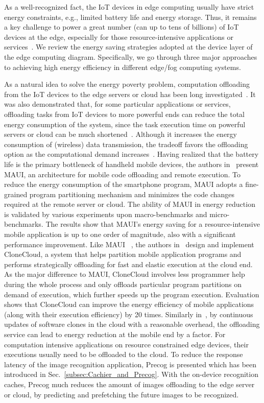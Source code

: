 As a well-recognized fact, the IoT devices in edge computing usually have strict energy constraints, e.g., limited battery life and energy storage. Thus, it remains a key challenge to power a great number (can up to tens of billions) of IoT devices at the edge, especially for those resource-intensive applications or services~. We review the energy saving strategies adopted at the device layer of the edge computing diagram. Specifically, we go through three major approaches to achieving high energy efficiency in different edge/fog computing systems.

As a natural idea to solve the energy poverty problem, computation offloading from the IoT devices to the edge servers or cloud has been long investigated~. It was also demonstrated that, for some particular applications or services, offloading tasks from IoT devices to more powerful ends can reduce the total energy consumption of the system, since the task execution time on powerful servers or cloud can be much shortened~. Although it increases the energy consumption of (wireless) data transmission, the tradeoff favors the offloading option as the computational demand increases~.
Having realized that the battery life is the primary bottleneck of handheld mobile devices, the authors in~ present MAUI, an architecture for mobile code offloading and remote execution. To reduce the energy consumption of the smartphone program, MAUI adopts a fine-grained program partitioning mechanism and minimizes the code changes required at the remote server or cloud. The ability of MAUI in energy reduction is validated by various experiments upon macro-benchmarks and micro-benchmarks. The results show that MAUI's energy saving for a resource-intensive mobile application is up to one order of magnitude, also with a significant performance improvement.
Like MAUI~ , the authors in~ design and implement CloneCloud, a system that helps partition mobile application programs and performs strategically offloading for fast and elastic execution at the cloud end. As the major difference to MAUI, CloneCloud involves less programmer help during the whole process and only offloads particular program partitions on demand of execution, which further speeds up the program execution. Evaluation shows that CloneCloud can improve the energy efficiency of mobile applications (along with their execution efficiency) by 20 times. Similarly in~, by continuous updates of software clones in the cloud with a reasonable overhead, the offloading service can lead to energy reduction at the mobile end by a factor.
For computation intensive applications on resource constrained edge devices, their executions usually need to be offloaded to the cloud. To reduce the response latency of the image recognition application, Precog is presented which has been introduced in Sec.~\ref{subsec:Cachier_and_Precog}. With the on-device recognition caches, Precog much reduces the amount of images offloading to the edge server or cloud, by predicting and prefetching the future images to be recognized.

